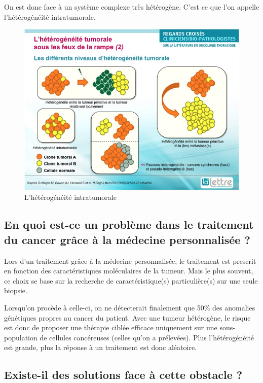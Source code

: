 \documentclass[12pt, openany]{report}
\begin{document}
On est donc face à un système complexe très hétérogène. C’est ce que l’on appelle l’hétérogénéité intratumorale.

 \begin{figure}[H]
\begin{center}
    \includegraphics[scale=1]{Images/im13.png}
\caption{L’hétérogénéité intratumorale}
\end{center}
\end{figure}

\subsection{En quoi est-ce un problème dans le traitement du cancer grâce à la médecine personnalisée ?}

Lors d’un traitement grâce à la médecine personnalisée, le traitement est prescrit en fonction des caractéristiques moléculaires de la tumeur. Mais le plus souvent, ce choix se base sur la recherche de caractéristique(s) particulière(s) sur une seule biopsie. 

Lorsqu’on procède à celle-ci, on ne détecterait finalement que 50\% des anomalies génétiques propres au cancer du patient. Avec une tumeur hétérogène, le risque est donc de proposer une thérapie ciblée efficace uniquement sur une sous-population de cellules cancéreuses (celles qu’on a prélevées). Plus l'hétérogénéité est grande, plus la réponse à un traitement est donc aléatoire. 

\subsection{Existe-il des solutions face à cette obstacle ?}
\end{document}
